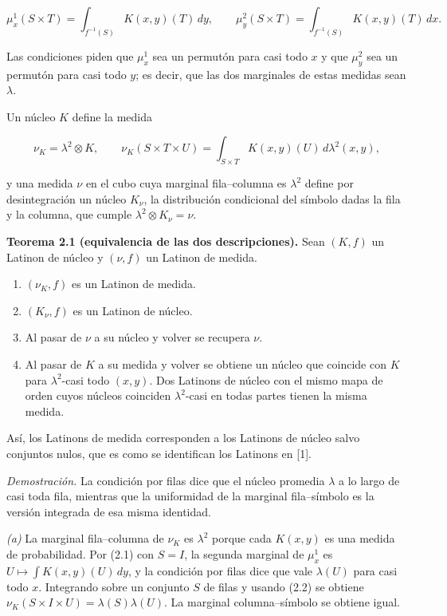 \documentclass[spanish,11pt,a4paper]{article}
\begin{document}
\nopagebreak[4]
\[\mu^1_x(S\times T)=\int_{f^{-1}(S)}K(x,y)(T)\,dy,\qquad
\mu^2_y(S\times T)=\int_{f^{-1}(S)}K(x,y)(T)\,dx.\tag{2.1}\]

Las condiciones piden que \(\mu^1_x\) sea un permutón para casi todo \(x\) y que \(\mu^2_y\) sea un permutón para casi todo \(y\); es decir, que las dos marginales de estas medidas sean \(\lambda\).

Un núcleo \(K\) define la medida

\nopagebreak[4]
\[\nu_K=\lambda^2\otimes K,\qquad
\nu_K(S\times T\times U)=\int_{S\times T}K(x,y)(U)\,d\lambda^2(x,y),\tag{2.2}\]

y una medida \(\nu\) en el cubo cuya marginal fila--columna es \(\lambda^2\) define por desintegración un núcleo \(K_\nu\), la distribución condicional del símbolo dadas la fila y la columna, que cumple \(\lambda^2\otimes K_\nu=\nu\).

\textbf{Teorema 2.1 (equivalencia de las dos descripciones).} Sean \((K,f)\) un Latinon de núcleo y \((\nu,f)\) un Latinon de medida.

\begin{enumerate}
\def\labelenumi{(\alph{enumi})}
\item
  \((\nu_K,f)\) es un Latinon de medida.
\item
  \((K_\nu,f)\) es un Latinon de núcleo.
\item
  Al pasar de \(\nu\) a su núcleo y volver se recupera \(\nu\).
\item
  Al pasar de \(K\) a su medida y volver se obtiene un núcleo que coincide con \(K\) para \(\lambda^2\)-casi todo \((x,y)\). Dos Latinons de núcleo con el mismo mapa de orden cuyos núcleos coinciden \(\lambda^2\)-casi en todas partes tienen la misma medida.
\end{enumerate}

Así, los Latinons de medida corresponden a los Latinons de núcleo salvo conjuntos nulos, que es como se identifican los Latinons en {[}1{]}.

\emph{Demostración.} La condición por filas dice que el núcleo promedia \(\lambda\) a lo largo de casi toda fila, mientras que la uniformidad de la marginal fila--símbolo es la versión integrada de esa misma identidad.

\emph{(a)} La marginal fila--columna de \(\nu_K\) es \(\lambda^2\) porque cada \(K(x,y)\) es una medida de probabilidad. Por (2.1) con \(S=I\), la segunda marginal de \(\mu^1_x\) es \(U\mapsto\int K(x,y)(U)\,dy\), y la condición por filas dice que vale \(\lambda(U)\) para casi todo \(x\). Integrando sobre un conjunto \(S\) de filas y usando (2.2) se obtiene \(\nu_K(S\times I\times U)=\lambda(S)\lambda(U)\). La marginal columna--símbolo se obtiene igual.
\end{document}
